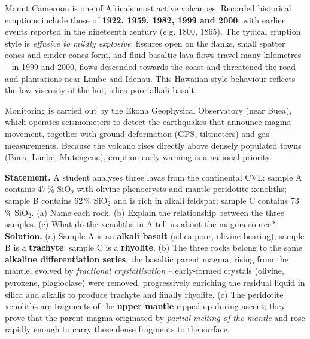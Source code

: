 \documentclass[11pt]{article}
\newcommand{\cle}[1]{{\popxbold\color{popdark}#1}}
\newcounter{popsec}
\newcounter{popsub}
\newcommand{\courssub}[1]{%
  \stepcounter{popsub}%
  \par\vspace{9pt}\noindent{\popxbold\fontsize{11.5}{13}\selectfont\color{popink}{\color{poporange}\thepopsec.\thepopsub}\hspace{6pt}#1}\par\nopagebreak\vspace{4pt}
}
\begin{document}
\courssub{Mount Cameroon: an Active Volcano}

Mount Cameroon is one of Africa's most active volcanoes. Recorded historical eruptions include those of \textbf{1922, 1959, 1982, 1999 and 2000}, with earlier events reported in the nineteenth century (e.g. 1800, 1865). The typical eruption style is \emph{effusive to mildly explosive}: fissures open on the flanks, small \cle{spatter cones} and cinder cones form, and fluid basaltic lava flows travel many kilometres -- in 1999 and 2000, flows descended towards the coast and threatened the road and plantations near Limbe and Idenau. This Hawaiian-style behaviour reflects the low viscosity of the hot, silica-poor alkali basalt.

Monitoring is carried out by the \cle{Ekona Geophysical Observatory} (near Buea), which operates seismometers to detect the earthquakes that announce magma movement, together with ground-deformation (GPS, tiltmeters) and gas measurements. Because the volcano rises directly above densely populated towns (Buea, Limbe, Mutengene), eruption early warning is a national priority.

\begin{exoresolu}
\textbf{Statement.} A student analyses three lavas from the continental CVL: sample A contains 47\,\% SiO$_2$ with olivine phenocrysts and mantle peridotite xenoliths; sample B contains 62\,\% SiO$_2$ and is rich in alkali feldspar; sample C contains 73\,\% SiO$_2$. (a) Name each rock. (b) Explain the relationship between the three samples. (c) What do the xenoliths in A tell us about the magma source?
\tcblower
\textbf{Solution.} (a) Sample A is an \textbf{alkali basalt} (silica-poor, olivine-bearing); sample B is a \textbf{trachyte}; sample C is a \textbf{rhyolite}. (b) The three rocks belong to the same \textbf{alkaline differentiation series}: the basaltic parent magma, rising from the mantle, evolved by \emph{fractional crystallisation} -- early-formed crystals (olivine, pyroxene, plagioclase) were removed, progressively enriching the residual liquid in silica and alkalis to produce trachyte and finally rhyolite. (c) The peridotite xenoliths are fragments of the \textbf{upper mantle} ripped up during ascent; they prove that the parent magma originated by \emph{partial melting of the mantle} and rose rapidly enough to carry these dense fragments to the surface.
\end{exoresolu}
\end{document}
